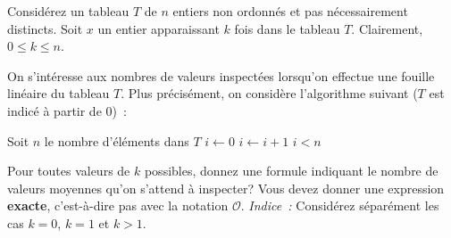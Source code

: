 \documentclass[12pt,addpoints]{exam}
\newcommand{\bigo}{\mathcal{O}}
\begin{document}
\begin{questions}

\question
Considérez un tableau $T$ de $n$ entiers non ordonnés et pas nécessairement distincts. Soit $x$ un entier apparaissant $k$ fois dans le tableau $T$. Clairement, $0 \leq k \leq n$.

On s'intéresse aux nombres de valeurs inspectées lorsqu'on effectue une fouille linéaire du tableau $T$. Plus précisément, on considère l'algorithme suivant ($T$ est indicé à partir de $0$)~:
\begin{algorithmic}[1]
    \State Soit $n$ le nombre d'éléments dans $T$
    \State $i \gets 0$
      \State $i \gets i + 1$
    \EndWhile
    \State \Return $i < n$
  \EndFunction
\end{algorithmic}
Pour toutes valeurs de $k$ possibles, donnez une formule indiquant le nombre de valeurs moyennes qu'on s'attend à inspecter? Vous devez donner une expression \textbf{exacte}, c'est-à-dire pas avec la notation $\bigo$. \emph{Indice~:} Considérez séparément les cas $k = 0$, $k = 1$ et $k > 1$.

\end{questions}
\end{document}
